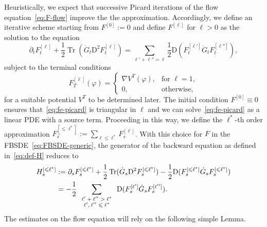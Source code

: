 \documentclass[11pt, a4paper]{scrartcl}
\numberwithin{equation}{section}
\theoremstyle{plain}
\theoremstyle{remark}
\newcommand{\assign}{:=}
\newcommand{\mathD}{\mathrm{D}}
\newcommand{\tmop}[1]{\ensuremath{\operatorname{#1}}}
\newcommand{\tmscript}[1]{\text{\scriptsize{$#1$}}}
\begin{document}
Heuristically, we expect that successive Picard iterations of the flow
equation~\eqref{eq:F-flow} improve the the approximation. Accordingly, we
define an iterative scheme starting from $F^{[0]} \assign 0$ and define
$F^{[\ell]}$ for $\ell > 0$ as the solution to the equation
\begin{equation}
	\partial_t F^{[\ell]}_t + \frac{1}{2} \tmop{Tr} (\dot{G}_t \mathD^2
	F^{[\ell]}_t) = \sum_{\ell' + \ell'' = \ell} \frac{1}{2} \mathD
	(F_t^{[\ell']}  \dot{G}_t F^{[\ell'']}_t), \label{eq:fe-picard}
\end{equation}
subject to the terminal conditions
\begin{equation}
	F^{[\ell]}_T (\varphi) = \begin{cases}
		\nabla V^T (\varphi), & \text{for } \ell = 1, \\
		0,                    & \text{otherwise,}
	\end{cases} \label{eq:fe-terminal-conditions}
\end{equation}
for a suitable potential $V^T$ to be determined later. The initial condition
$F^{[0]} \equiv 0$ ensures that~\eqref{eq:fe-picard} is triangular in $\ell$
and we can solve~\eqref{eq:fe-picard} as a linear PDE with a source term.
Proceeding in this way, we define the $\ell^{\ast}$-th order approximation
$F^{[\leqslant \ell^{\ast}]}_s \assign \sum_{\ell \leqslant \ell^{\ast}}
	F^{[\ell]}_s$. With this choice for $F$ in the FBSDE~\eqref{eq:FBSDE-generic},
the generator of the backward equation as defined in~\eqref{eq:def-H} reduces
to
\begin{align*}
	H^{[\leqslant \ell^{\ast}]}_s
	 & \assign \partial_s F^{[\leqslant
					\ell^{\ast}]}_s + \frac{1}{2} \tmop{Tr} (\dot{G}_s \mathD^2 F^{[\leqslant
		\ell^{\ast}]}_s) - \frac{1}{2} \mathD (F^{[\leqslant \ell^{\ast}]}_s
	\dot{G}_s F^{[\leqslant \ell^{\ast}]}_s) \\
	 & = - \frac{1}{2}
	\sum_{\tmscript{\begin{array}{c}
				                \ell' + \ell'' > \ell^{\ast} \\
				                \ell', \ell'' \leqslant \ell^{\ast}
			                \end{array}}} \mathD (F_s^{[\ell']}  \dot{G}_s F^{[\ell'']}_s) .
	\label{eq:appr-H}
\end{align*}
The estimates on the flow equation will rely on the following simple Lemma.
\end{document}
